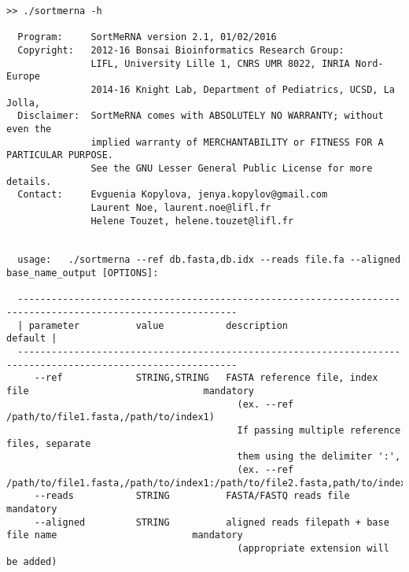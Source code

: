 \documentclass[10pt,a4paper]{article}
\begin{document}
\begin{Verbatim}[fontsize=\footnotesize]
>> ./sortmerna -h

  Program:     SortMeRNA version 2.1, 01/02/2016
  Copyright:   2012-16 Bonsai Bioinformatics Research Group:
               LIFL, University Lille 1, CNRS UMR 8022, INRIA Nord-Europe
               2014-16 Knight Lab, Department of Pediatrics, UCSD, La Jolla,
  Disclaimer:  SortMeRNA comes with ABSOLUTELY NO WARRANTY; without even the
               implied warranty of MERCHANTABILITY or FITNESS FOR A PARTICULAR PURPOSE.
               See the GNU Lesser General Public License for more details.
  Contact:     Evguenia Kopylova, jenya.kopylov@gmail.com 
               Laurent Noe, laurent.noe@lifl.fr
               Helene Touzet, helene.touzet@lifl.fr


  usage:   ./sortmerna --ref db.fasta,db.idx --reads file.fa --aligned base_name_output [OPTIONS]:

  -------------------------------------------------------------------------------------------------------------
  | parameter          value           description                                                    default |
  -------------------------------------------------------------------------------------------------------------
     --ref             STRING,STRING   FASTA reference file, index file                               mandatory
                                         (ex. --ref /path/to/file1.fasta,/path/to/index1)
                                         If passing multiple reference files, separate 
                                         them using the delimiter ':',
                                         (ex. --ref /path/to/file1.fasta,/path/to/index1:/path/to/file2.fasta,path/to/index2)
     --reads           STRING          FASTA/FASTQ reads file                                         mandatory
     --aligned         STRING          aligned reads filepath + base file name                        mandatory
                                         (appropriate extension will be added)


\end{Verbatim}
\end{document}
